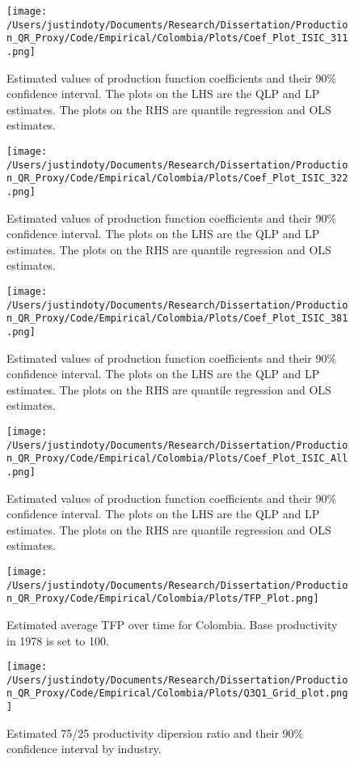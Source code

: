 \documentclass[11pt]{article}
\begin{document}
\begin{figure}[H]
\centering
\texttt{[image: /Users/justindoty/Documents/Research/Dissertation/Production\_QR\_Proxy/Code/Empirical/Colombia/Plots/Coef\_Plot\_ISIC\_311.png]}
\caption{Estimated values of production function coefficients and their 90\% confidence interval. The plots on the LHS are the QLP and LP estimates. The plots on the RHS are quantile regression and OLS estimates.}
\end{figure}

\begin{figure}[H]
\centering
\texttt{[image: /Users/justindoty/Documents/Research/Dissertation/Production\_QR\_Proxy/Code/Empirical/Colombia/Plots/Coef\_Plot\_ISIC\_322.png]}
\caption{Estimated values of production function coefficients and their 90\% confidence interval. The plots on the LHS are the QLP and LP estimates. The plots on the RHS are quantile regression and OLS estimates.}
\end{figure}

\begin{figure}[H]
\centering
\texttt{[image: /Users/justindoty/Documents/Research/Dissertation/Production\_QR\_Proxy/Code/Empirical/Colombia/Plots/Coef\_Plot\_ISIC\_381.png]}
\caption{Estimated values of production function coefficients and their 90\% confidence interval. The plots on the LHS are the QLP and LP estimates. The plots on the RHS are quantile regression and OLS estimates.}
\end{figure}

\begin{figure}[H]
\centering
\texttt{[image: /Users/justindoty/Documents/Research/Dissertation/Production\_QR\_Proxy/Code/Empirical/Colombia/Plots/Coef\_Plot\_ISIC\_All.png]}
\caption{Estimated values of production function coefficients and their 90\% confidence interval. The plots on the LHS are the QLP and LP estimates. The plots on the RHS are quantile regression and OLS estimates.}
\end{figure}

\begin{figure}[H]
\centering
\texttt{[image: /Users/justindoty/Documents/Research/Dissertation/Production\_QR\_Proxy/Code/Empirical/Colombia/Plots/TFP\_Plot.png]}
\caption{Estimated average TFP over time for Colombia. Base productivity in 1978 is set to 100.}
\end{figure}

\begin{figure}[H]
\centering
\texttt{[image: /Users/justindoty/Documents/Research/Dissertation/Production\_QR\_Proxy/Code/Empirical/Colombia/Plots/Q3Q1\_Grid\_plot.png]}
\caption{Estimated 75/25 productivity dipersion ratio and their 90\% confidence interval by industry.}
\end{figure}
\end{document}
